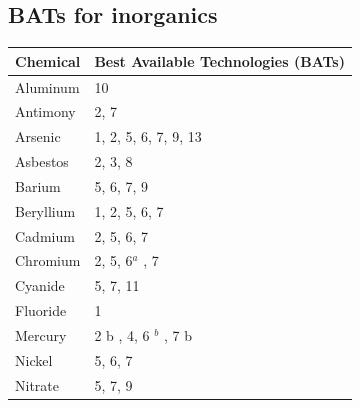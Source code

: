 \subsection{BATs for inorganics}  

\begin{table}[H]
\begin{tabular}{|l|l|}
\hline
\multicolumn{1}{|c|}{\textbf{Chemical}} & \multicolumn{1}{c|}{\textbf{Best Available Technologies (BATs)}} \\ \hline
Aluminum                                & 10                                                               \\ \hline
Antimony                                & 2, 7                                                             \\ \hline
Arsenic                                 & 1, 2, 5, 6, 7, 9, 13                                             \\ \hline
Asbestos                                & 2, 3, 8                                                          \\ \hline
Barium                                  & 5, 6, 7, 9                                                       \\ \hline
Beryllium                               & 1, 2, 5, 6, 7                                                    \\ \hline
Cadmium                                 & 2, 5, 6, 7                                                       \\ \hline
Chromium                                & 2, 5, 6$^a$ , 7                                                    \\ \hline
Cyanide                                 & 5, 7, 11                                                         \\ \hline
Fluoride                                & 1                                                                \\ \hline
Mercury                                 & 2 b , 4, 6 $^b$ , 7 b                                               \\ \hline
Nickel                                  & 5, 6, 7                                                          \\ \hline
Nitrate                                 & 5, 7, 9                                                          \\ \hline

\end{tabular}
\end{table}

